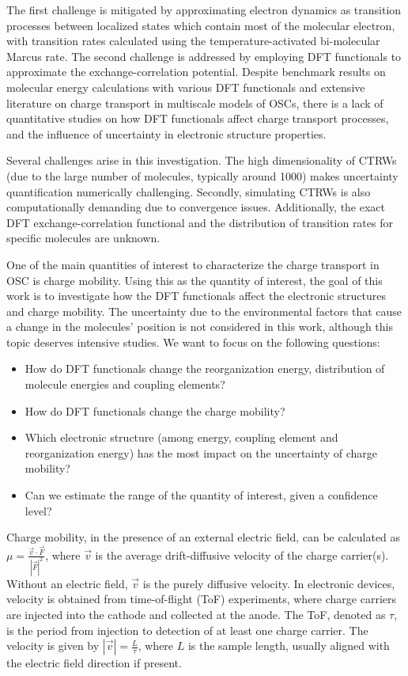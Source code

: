 \documentclass[letterpaper,12pt]{article}
\begin{document}
The first challenge is mitigated by approximating electron dynamics as transition processes between localized states which contain most of the molecular electron, with transition rates calculated using the temperature-activated bi-molecular Marcus rate. 
The second challenge is addressed by employing DFT functionals to approximate the exchange-correlation potential. 
Despite benchmark results on molecular energy calculations with various DFT functionals and extensive literature on charge transport in multiscale models of OSCs, there is a lack of quantitative studies on how DFT functionals affect charge transport processes, and the influence of uncertainty in electronic structure properties.

Several challenges arise in this investigation. The high dimensionality of CTRWs (due to the large number of molecules, typically around 1000) makes uncertainty quantification numerically challenging. Secondly, simulating CTRWs is also computationally demanding due to convergence issues. Additionally, the exact DFT exchange-correlation functional and the distribution of transition rates for specific molecules are unknown.


One of the main quantities of interest to characterize the charge transport in OSC is charge mobility. Using this as the quantity of interest,
the goal of this work is to investigate how the DFT functionals affect the electronic structures and charge mobility. The uncertainty due to the environmental factors that cause a change in the molecules' position is not considered in this work, although this topic deserves intensive studies.
We want to focus on the following questions: 
\begin{itemize}
    \item How do DFT functionals change the reorganization energy, distribution of molecule energies and coupling elements? 
    \item How do DFT functionals change the charge mobility?
    \item Which electronic structure (among energy, coupling element and reorganization energy) has the most impact on the uncertainty of charge mobility?
    \item Can we estimate the range of the quantity of interest, given a confidence level?
\end{itemize}

Charge mobility, in the presence of an external electric field, can be calculated as $\mu = \frac{\vec{v} \cdot \vec{F}}{|\vec{F}|^2}$, where $\vec{v}$ is the average drift-diffusive velocity of the charge carrier(s). Without an electric field, $\vec{v}$ is the purely diffusive velocity. In electronic devices, velocity is obtained from time-of-flight (ToF) experiments, where charge carriers are injected into the cathode and collected at the anode. The ToF, denoted as $\tau$, is the period from injection to detection of at least one charge carrier. The velocity is given by $|\vec{v}| = \frac{L}{\tau}$, where $L$ is the sample length, usually aligned with the electric field direction if present.
\end{document}
